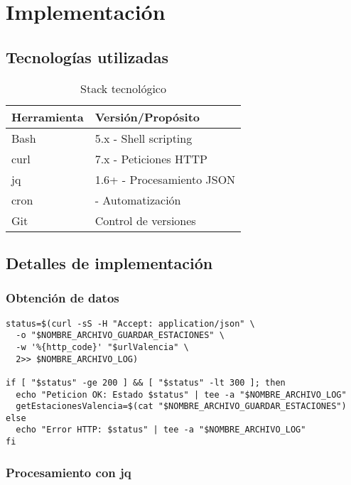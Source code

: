 \chapter{Implementación}

\section{Tecnologías utilizadas}

\begin{table}[H]
  \centering
  \begin{tabular}{@{}ll@{}}
    \toprule
    \textbf{Herramienta} & \textbf{Versión/Propósito} \\ \midrule
    Bash                 & 5.x - Shell scripting      \\
    curl                 & 7.x - Peticiones HTTP      \\
    jq                   & 1.6+ - Procesamiento JSON  \\
    cron                 & - Automatización           \\
    Git                  & Control de versiones       \\ \bottomrule
  \end{tabular}
  \caption{Stack tecnológico}
  \label{tab:stack}
\end{table}

\section{Detalles de implementación}

\subsection{Obtención de datos}

\begin{lstlisting}[style=bash,caption={Petición HTTP con curl}]
status=$(curl -sS -H "Accept: application/json" \
  -o "$NOMBRE_ARCHIVO_GUARDAR_ESTACIONES" \
  -w '%{http_code}' "$urlValencia" \
  2>> $NOMBRE_ARCHIVO_LOG)

if [ "$status" -ge 200 ] && [ "$status" -lt 300 ]; then
  echo "Peticion OK: Estado $status" | tee -a "$NOMBRE_ARCHIVO_LOG"
  getEstacionesValencia=$(cat "$NOMBRE_ARCHIVO_GUARDAR_ESTACIONES")
else
  echo "Error HTTP: $status" | tee -a "$NOMBRE_ARCHIVO_LOG"
fi
\end{lstlisting}

\subsection{Procesamiento con jq}

